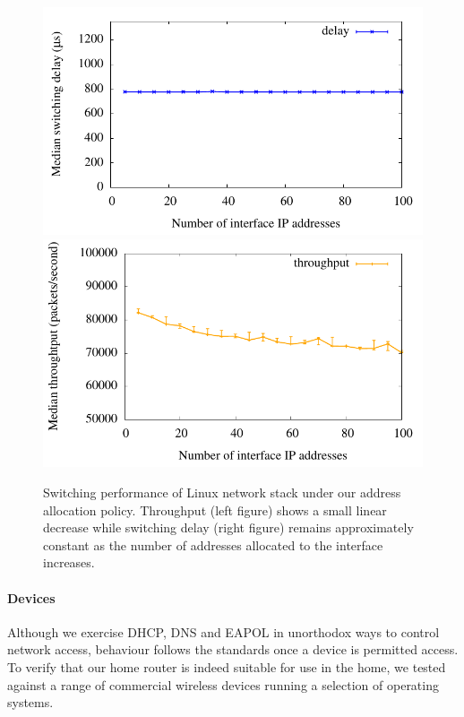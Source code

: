 \begin{figure} 
  \centering 
  \includegraphics[width=0.49\columnwidth]{Chapter2/Chapter2Figs/stack-throughput-latency}
  \includegraphics[width=0.49\columnwidth]{Chapter2/Chapter2Figs/stack-throughput-throughput}
  \caption{\label{f:stack-throughput}Switching performance of Linux network
    stack under our address allocation policy. Throughput (left figure) shows a
    small linear decrease while switching delay (right figure) remains
    approximately constant as the number of addresses allocated to the interface
    increases.} \end{figure}

\paragraph{Devices} Although we exercise DHCP, DNS and EAPOL in unorthodox ways
to control network access, behaviour follows the standards once a device is
permitted access.  To verify that our home router is indeed suitable for use in
the home, we tested against a range of commercial wireless devices running a
selection of operating systems. 

